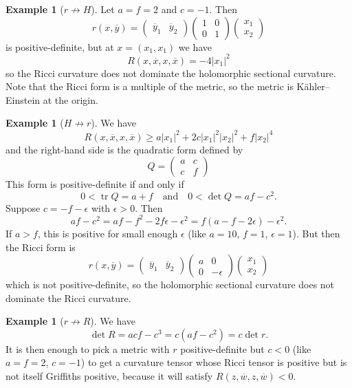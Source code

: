 \documentclass[10pt,a4paper]{amsart}
\theoremstyle{definition}
\newtheorem{exam}[theo]{Example}
\def\ov#1{\overline{#1}}
\def\qandq{\quad\text{and}\quad}
\DeclareMathOperator{\tr}{tr}
\begin{document}
\begin{exam}[$r \not\to H$]
Let $a = f = 2$ and $c = -1$. Then
$$
r(x, \ov y) =
\begin{pmatrix}\ov y_1 & \ov y_2 \end{pmatrix}
\begin{pmatrix}
1 & 0 \\ 0 & 1
\end{pmatrix}
\begin{pmatrix} x_1 \\ x_2 \end{pmatrix}
$$
is positive-definite, but at $x = (x_1, x_1)$ we have
$$
R(x, \ov x, x, \ov x) = -4 |x_1|^2
$$
so the Ricci curvature does not dominate the holomorphic sectional curvature.
Note that the Ricci form is a multiple of the metric, so the metric is
K\"ahler--Einstein at the origin.
\end{exam}

\begin{exam}[$H \not\to r$]
We have
$$
R(x, \ov x, x, \ov x)
\geq
a |x_1|^2 + 2c |x_1|^2 |x_2|^2 + f |x_2|^4
$$
and the right-hand side is the quadratic form defined by
$$
Q = \begin{pmatrix}
a & c \\ c & f
\end{pmatrix}
$$
This form is positive-definite if and only if
$$
0 < \tr Q = a + f
\qandq
0 < \det Q = af - c^2.
$$
Suppose $c = -f - \epsilon$ with $\epsilon > 0$.
Then
$$
af - c^2
= af - f^2 - 2f \epsilon - \epsilon^2
= f(a - f - 2\epsilon) - \epsilon^2.
$$
If $a > f$, this is positive for small enough $\epsilon$ (like $a = 10$, $f =
1$, $\epsilon = 1$).
But then the Ricci form is
$$
r(x, \ov y) =
\begin{pmatrix}\ov y_1 & \ov y_2 \end{pmatrix}
\begin{pmatrix}
a & 0 \\ 0 & -\epsilon
\end{pmatrix}
\begin{pmatrix} x_1 \\ x_2 \end{pmatrix}
$$
which is not positive-definite,
so the holomorphic sectional curvature does not dominate the Ricci
curvature.
\end{exam}

\begin{exam}[$r \not\to R$]
We have
$$
\det R = acf - c^3 = c(af - c^2) = c \det r.
$$
It is then enough to pick a metric with $r$ positive-definite but $c < 0$
(like $a = f = 2$, $c = -1$)
to get a curvature tensor whose Ricci tensor is positive but is not itself
Griffiths positive, because it will satisfy $R(z, \ov w, z, \ov w) < 0$.
\end{exam}
\end{document}
